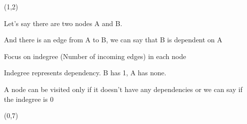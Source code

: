     \color{black}

    \begin{textblock}{14}(1,2)
    \begin{itemize}
         {
            \vfill \item<1->[$\blacksquare$] Let's say there are two nodes A and B.
            \vfill \item<2->[$\blacksquare$] And there is an edge from A to B, we can say that B is dependent on A
        }
        \item[$\blacksquare$]<3-> Focus on indegree (Number of incoming edges) in each node
        \item<4->[$\blacksquare$] Indegree represents dependency. B has 1, A has none.
        \item<5->[$\blacksquare$] A node can be visited only if it doesn't have any dependencies or we can say if the indegree is 0 
    \end{itemize}
    \end{textblock}

    \begin{textblock}{16}(0,7)
    \begin{figure}
    \centering
    \end{figure}
    \end{textblock}
    